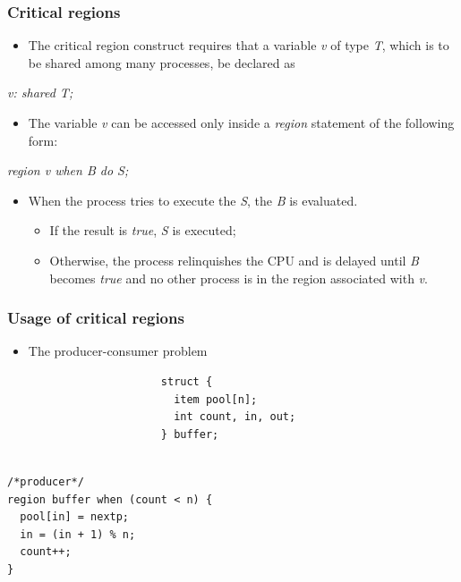 \documentclass[CJKutf8,xcolor=pdftex,dvipsnames,table]{beamer}
\begin{document}
\begin{CJK*}{UTF8}{song}
\iffalse

  \begin{frame}
  \frametitle{Critical regions} \pause
  \begin{itemize}
  \item{The critical region construct requires that a variable \emph{v} of type \emph{T}, which is to be shared among many processes, be declared as} \pause
  \end{itemize}
  {\centering\emph{v: shared T;}} \pause
  \begin{itemize}
  \item{The variable \emph{v} can be accessed only inside a \emph{region} statement of the following form:} \pause
  \end{itemize}
  {\centering\emph{region v when B do S;}} \pause
  \begin{itemize}
  \item{When the process tries to execute the \emph{S}, the \emph{B} is evaluated.} \pause
    \begin{itemize}
    \item{If the result is \emph{true}, \emph{S} is executed;} \pause
    \item{Otherwise, the process relinquishes the CPU and is delayed until \emph{B} becomes \emph{true} and no other process is in the region associated with \emph{v}.}
    \end{itemize}
  \end{itemize}
  \end{frame}

  \begin{frame}[fragile]
  \frametitle{Usage of critical regions} \pause
  \begin{itemize}
  \item{The producer-consumer problem} \pause
  \end{itemize}

\begin{lstlisting}
                        struct {
                          item pool[n];
                          int count, in, out;
                        } buffer;
\end{lstlisting}
  \pause
  \begin{minipage}[c]{0.5\textwidth}
\begin{lstlisting}

/*producer*/
region buffer when (count < n) {
  pool[in] = nextp;
  in = (in + 1) % n;
  count++;
}
\end{lstlisting}
  \pause
  \end{minipage}%
  \begin{minipage}[c]{0.5\textwidth}
\begin{lstlisting}


\end{lstlisting}
\end{minipage}
\end{frame}
\end{CJK*}
\end{document}
